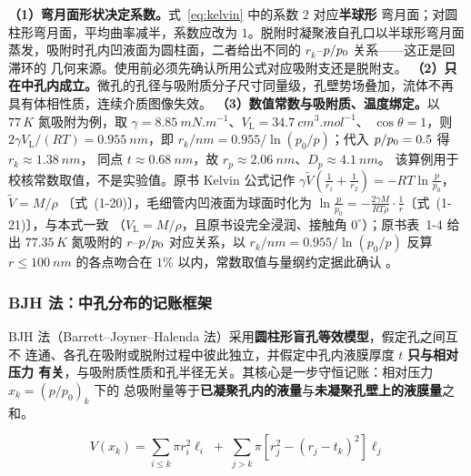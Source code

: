 \begin{keycond}
\textbf{（1）弯月面形状决定系数。}式~\eqref{eq:kelvin} 中的系数 $2$ 对应\textbf{半球形}
弯月面；对圆柱形弯月面，平均曲率减半，系数应改为 $1$。脱附时凝聚液自孔口以半球形弯月面
蒸发，吸附时孔内凹液面为圆柱面，二者给出不同的 $r_k$--$p/p_{0}$ 关系——这正是回滞环的
几何来源。使用前必须先确认所用公式对应吸附支还是脱附支。
\textbf{（2）只在中孔内成立。}微孔的孔径与吸附质分子尺寸同量级，孔壁势场叠加，流体不再
具有体相性质，连续介质图像失效。
\textbf{（3）数值常数与吸附质、温度绑定。}以 $77\,\unit{K}$ 氮吸附为例，取
$\gamma=\qty{8.85}{mN.m^{-1}}$、$V_{\mathrm{L}}=\qty{34.7}{cm^3.mol^{-1}}$、
$\cos\theta=1$，则 $2\gamma V_{\mathrm{L}}/(RT)=\qty{0.955}{nm}$，即
$r_k/\unit{nm}=0.955\big/\ln(p_0/p)$；代入 $p/p_{0}=0.5$ 得 $r_k\approx\qty{1.38}{nm}$，
同点 $t\approx\qty{0.68}{nm}$，故 $r_p\approx\qty{2.06}{nm}$、$D_p\approx\qty{4.1}{nm}$。
该算例用于校核常数取值，不是实验值。原书 Kelvin 公式记作
$\gamma\tilde{V}\left(\frac{1}{r_1}+\frac{1}{r_2}\right)=-RT\ln\frac{p}{p_0}$，$\tilde{V}=M/\rho$
〔式~(1-20)〕，毛细管内凹液面为球面时化为
$\ln\frac{p}{p_0}=-\frac{2\gamma M}{RT\rho}\cdot\frac{1}{r}$〔式~(1-21)〕，与本式一致
（$V_{\mathrm{L}}=M/\rho$，且原书设完全浸润、接触角 $0^{\circ}$）；原书表~1-4 给出
$77.35\,\unit{K}$ 氮吸附的 $r$--$p/p_{0}$ 对应关系，以 $r_k/\unit{nm}=0.955/\ln(p_0/p)$
反算 $r\le\qty{100}{nm}$ 的各点吻合在 $1\%$ 以内，常数取值与量纲约定据此确认
。
\end{keycond}

\subsubsection{BJH 法：中孔分布的记账框架}

BJH 法（Barrett--Joyner--Halenda 法）采用\textbf{圆柱形盲孔等效模型}，假定孔之间互不
连通、各孔在吸附或脱附过程中彼此独立，并假定中孔内液膜厚度 $t$ \textbf{只与相对压力
有关}，与吸附质性质和孔半径无关。其核心是一步守恒记账：相对压力 $x_k=(p/p_0)_k$ 下的
总吸附量等于\textbf{已凝聚孔内的液量}与\textbf{未凝聚孔壁上的液膜量}之和。

\begin{equation}\label{eq:bjh-balance}
V(x_k)=\sum_{i\le k}\pi r_i^{2}\ell_i
\;+\;\sum_{j>k}\pi\!\left[r_j^{2}-\left(r_j-t_k\right)^{2}\right]\ell_j
\end{equation}

